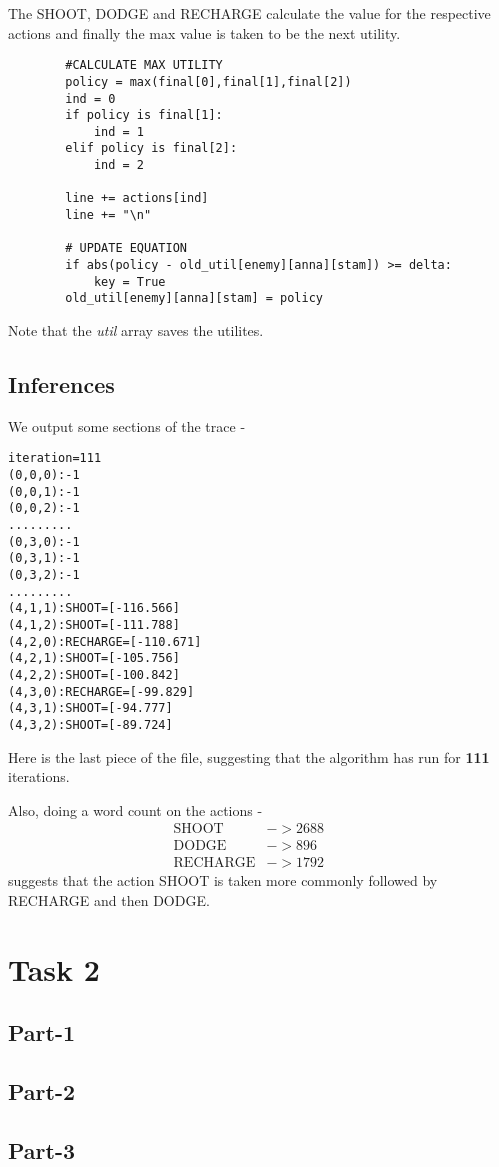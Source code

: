 \documentclass[11pt]{article}
\begin{document}
	The {SHOOT}, {DODGE} and {RECHARGE} calculate the value for the respective actions and finally the max value is taken to be the next utility.
	\begin{lstlisting}
		#CALCULATE MAX UTILITY 
		policy = max(final[0],final[1],final[2])
		ind = 0
		if policy is final[1]:
			ind = 1
		elif policy is final[2]:
			ind = 2
	
		line += actions[ind]
		line += "\n"
	
		# UPDATE EQUATION
		if abs(policy - old_util[enemy][anna][stam]) >= delta:
			key = True
		old_util[enemy][anna][stam] = policy
	\end{lstlisting}
	Note that the \emph{util} array saves the utilites.
	\subsection{Inferences}
	We output some sections of the trace - \begin{lstlisting}
iteration=111
(0,0,0):-1
(0,0,1):-1
(0,0,2):-1
.........
(0,3,0):-1
(0,3,1):-1
(0,3,2):-1
.........	
(4,1,1):SHOOT=[-116.566]
(4,1,2):SHOOT=[-111.788]
(4,2,0):RECHARGE=[-110.671]
(4,2,1):SHOOT=[-105.756]
(4,2,2):SHOOT=[-100.842]
(4,3,0):RECHARGE=[-99.829]
(4,3,1):SHOOT=[-94.777]
(4,3,2):SHOOT=[-89.724]
\end{lstlisting}
Here is the last piece of the file, suggesting that the algorithm has run for \textbf{111} iterations. 


Also, doing a word count on the actions - 
\begin{align*}
	\textrm{SHOOT} &->2688  & & \\
	\textrm{DODGE} &->896  & &\\
	\textrm{RECHARGE} &->1792 & & 
\end{align*} 
suggests that the action SHOOT is taken more commonly followed by RECHARGE and then DODGE. 

\section{Task 2}
\subsection{Part-1}
\subsection{Part-2}
\subsection{Part-3}
\end{document}
